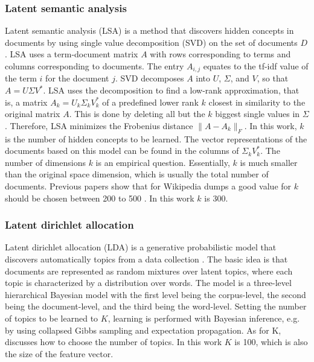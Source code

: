 \documentclass[a4paper]{article}
\begin{document}
\subsubsection{Latent semantic analysis}
Latent semantic analysis (LSA) \cite{deerwester1990indexing} is a method that discovers hidden concepts in documents by using single value decomposition (SVD) on the set of documents $D$.
LSA uses a term-document matrix $A$ with rows corresponding to terms and columns corresponding to documents. The entry $A_{i,j}$ equates to the tf-idf value of the term $i$ for the document $j$. SVD decomposes $A$ into $U$, $\Sigma$, and $V$, so that $A = U \Sigma V^*$.
LSA uses the decomposition to find a low-rank approximation, that is, a matrix $A_k = U_k \Sigma_k V_k^*$ of a predefined lower rank $k$ closest in similarity to the original matrix $A$. This is done by deleting all but the $k$ biggest single values in $\Sigma$.
Therefore, LSA minimizes the Frobenius distance $\|A-A_k\|_F$. In this work, $k$ is the number of hidden concepts to be learned. The vector representations of the documents based on this model can be found in the columns of $\Sigma_k V_k^*$.
The number of dimensions $k$ is an empirical question. Essentially, $k$ is much smaller than the original space dimension, which is usually the total number of documents. Previous papers show that for Wikipedia dumps a good value for $k$ should be chosen between 200 to 500 \cite{bradford2008empirical}. In this work $k$ is 300.


\subsubsection{Latent dirichlet allocation}
Latent dirichlet allocation (LDA) \cite{blei2003latent} is a generative probabilistic model that discovers automatically topics from a data collection .
The basic idea is that documents are represented as random mixtures over latent topics, where each topic is characterized by a distribution over words. The model is a three-level hierarchical Bayesian model with the first level being the corpus-level, the second being the document-level, and the third being the word-level. Setting the number of topics to be learned to $K$, learning is performed with Bayesian inference, e.g. by using collapsed Gibbs sampling and expectation propagation. As for K, \cite{hoffman2010online} discusses how to choose the number of topics. In this work $K$ is 100, which is also the size of the feature vector.
\end{document}
